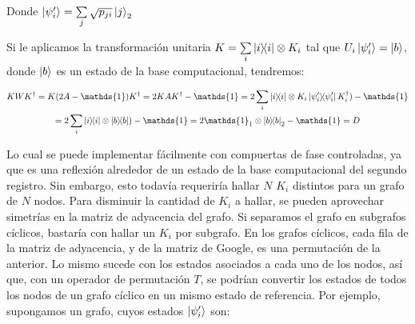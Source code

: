 Donde $\ket{\psi_i^\prime} = \sum\limits_j \sqrt{p_{j i}} \ket{j}_2$

Si le aplicamos la transformación unitaria $K = \sum\limits_i \ketbra{i}{i} \otimes K_i$ tal que $U_i \ket{\psi_i^\prime} = \ket{b}$, donde  $\ket{b}$ es un estado de la base computacional, tendremos:

\begin{multline}
K W K^\dagger = K (2 A - \mathds{1}) K^\dagger = 2 K A K^\dagger - \mathds{1} = 2 \sum\limits_i \ketbra{i}{i} \otimes K_i \ketbra{\psi_i^\prime}{\psi_i^\prime} K_i^\dagger) - \mathds{1} \\ = 2 \sum\limits_i \ketbra{i}{i} \otimes \ketbra{b}{b}) - \mathds{1} = 2 \mathds{1}_1 \otimes \ketbra{b}{b}_2 - \mathds{1} = D
\end{multline}

Lo cual se puede implementar fácilmente con compuertas de fase controladas, ya que es una reflexión alrededor de un estado de la base computacional del segundo registro. Sin embargo, esto todavía requeriría hallar $N$ $K_i$ distintos para un grafo de $N$ nodos. Para disminuir la cantidad de $K_i$ a hallar, se pueden aprovechar simetrías en la matriz de adyacencia del grafo. Si separamos el grafo en subgrafos cíclicos, bastaría con hallar un $K_i$ por subgrafo. En los grafos cíclicos, cada fila de la matriz de adyacencia, y de la matriz de Google, es una permutación de la anterior. Lo mismo sucede con los estados asociados a cada uno de los nodos, así que, con un operador de permutación $T$, se podrían convertir los estados de todos los nodos de un grafo cíclico en un mismo estado de referencia. Por ejemplo, supongamos un grafo, cuyos estados $\ket{\psi_i^\prime}$ son:

